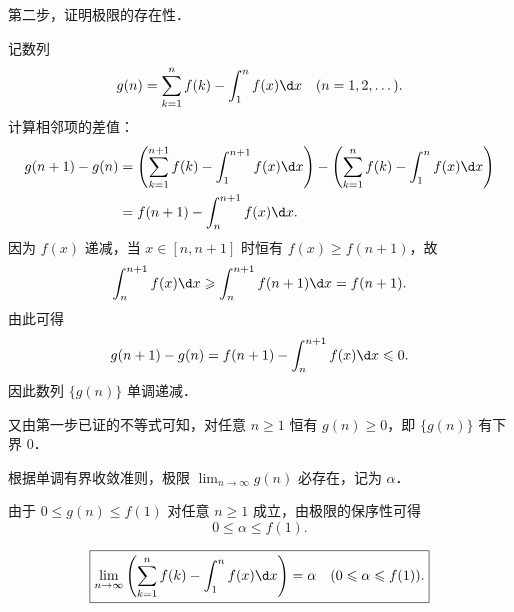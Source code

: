 \begin{solution}
\begin{center}
    \end{center}

    第二步，证明极限的存在性．

    记数列
    \begin{equation}
        g(n) = \sum_{k=1}^n f(k) - \int_1^n f(x) \d x \quad (n = 1, 2, \dots).
    \end{equation}
    计算相邻项的差值：
    \begin{equation}
        \begin{aligned}
            g(n+1) - g(n) & = \left( \sum_{k=1}^{n+1} f(k) - \int_1^{n+1} f(x) \d x \right) - \left( \sum_{k=1}^n f(k) - \int_1^n f(x) \d x \right) \\
                          & = f(n+1) - \int_n^{n+1} f(x) \d x.
        \end{aligned}
    \end{equation}
    因为 $f(x)$ 递减，当 $x \in [n, n+1]$ 时恒有 $f(x) \geqslant f(n+1)$，故
    \begin{equation}
        \int_n^{n+1} f(x) \d x \geqslant \int_n^{n+1} f(n+1) \d x = f(n+1).
    \end{equation}
    由此可得
    \begin{equation}
        g(n+1) - g(n) = f(n+1) - \int_n^{n+1} f(x) \d x \leqslant 0.
    \end{equation}
    因此数列 $\{g(n)\}$ 单调递减．

    又由第一步已证的不等式可知，对任意 $n \geqslant 1$ 恒有 $g(n) \geqslant 0$，即 $\{g(n)\}$ 有下界 $0$．

    根据单调有界收敛准则，极限 $\lim_{n\to\infty} g(n)$ 必存在，记为 $\alpha$．

    由于 $0 \leqslant g(n) \leqslant f(1)$ 对任意 $n \geqslant 1$ 成立，由极限的保序性可得
    \begin{equation}
        0 \leqslant \alpha \leqslant f(1).
    \end{equation}

    \begin{equation}
        \boxed{\lim_{n\to\infty} \left( \sum_{k=1}^n f(k) - \int_1^n f(x) \d x \right) = \alpha \quad (0 \leqslant \alpha \leqslant f(1)).}
    \end{equation}
\end{solution}

